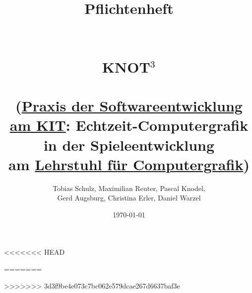 \documentclass{scrreprt}
\begin{document}
	\title{	
		Pflichtenheft\\~\\~\\
		\Huge{KNOT$^3$}\\~\\
		\Large (\href{http://pp.info.uni-karlsruhe.de/lehre/WS201314/pse/}{Praxis der Softwareentwicklung am KIT}: Echtzeit-Computergrafik in der Spieleentwicklung \\am \href{http://cg.ibds.kit.edu/index.php}{Lehrstuhl für Computergrafik})
	}
	
	\author{
		Tobias Schulz, Maximilian Reuter, Pascal Knodel,\\
	 	Gerd Augsburg, Christina Erler, Daniel Warzel
	} 
	 
	\date{\today}
	
	\maketitle

	\tableofcontents
<<<<<<< HEAD

	
=======
    
>>>>>>> 3d3f9be4e073c7bc062e579dcae267d6637baf3e
	
	
	
	
	
	
	
	
	
\end{document}
